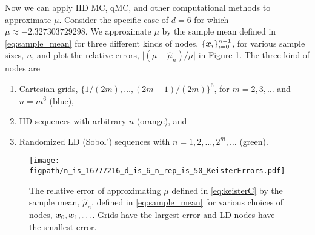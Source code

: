 \documentclass{svproc}
\newcommand{\figpath}{Figures}
\begin{document}
Now we can apply IID MC, qMC, and other computational methods to approximate $\mu$.  Consider the specific case of $d=6$ for which $\mu \approx -2.327303729298$.  We approximate $\mu$ by the sample mean defined in \eqref{eq:sample_mean} for three different kinds of nodes, $\{{\boldsymbol{x}}_i\}_{i=0}^{n-1}$, for various sample sizes, $n$, and plot the relative errors, $\lvert (\mu - 	\hat{\mu}_n)/\mu\rvert$ in Figure \ref{fig:keister-err}. The three kind of nodes are
\begin{enumerate}
	\renewcommand{\labelenumi}{\roman{enumi}.}
	\item Cartesian grids, $\{1/(2m), \ldots, (2m-1)/(2m) \}^6$, for $m = 2, 3, \ldots$ and $n = m^6$ (blue),
	\item IID sequences with arbitrary $n$ (orange), and
	\item Randomized LD (Sobol') sequences with $n = 1, 2, \ldots, 2^m, \ldots $ (green).
\end{enumerate}

\begin{figure}
	\centering
	\texttt{[image: \\figpath/n\_is\_16777216\_d\_is\_6\_n\_rep\_is\_50\_KeisterErrors.pdf]}
	\caption{The relative error of approximating $\mu$ defined in \eqref{eq:keisterC} by the sample mean, $\hat{\mu}_n$, defined in \eqref{eq:sample_mean} for various choices of nodes, ${\boldsymbol{x}}_0, {\boldsymbol{x}}_1, \ldots$.  Grids have the largest error and LD nodes have the smallest error. \label{fig:keister-err}}
\end{figure}
\end{document}
